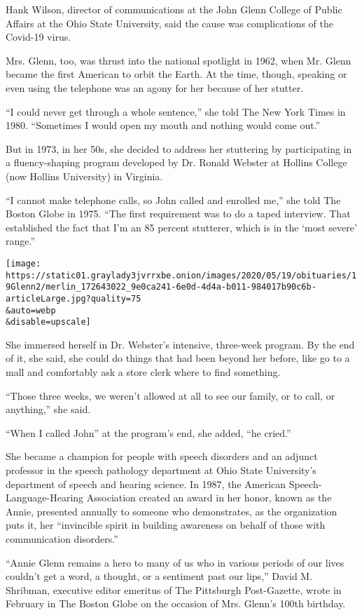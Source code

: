 Hank Wilson, director of communications at the John Glenn College of
Public Affairs at the Ohio State University, said the cause was
complications of the Covid-19 virus.

Mrs. Glenn, too, was thrust into the national spotlight in 1962, when
Mr. Glenn became the first American to orbit the Earth. At the time,
though, speaking or even using the telephone was an agony for her
because of her stutter.

``I could never get through a whole sentence,'' she told The New York
Times in 1980. ``Sometimes I would open my mouth and nothing would come
out.''

But in 1973, in her 50s, she decided to address her stuttering by
participating in a fluency-shaping program developed by Dr. Ronald
Webster at Hollins College (now Hollins University) in Virginia.

``I cannot make telephone calls, so John called and enrolled me,'' she
told The Boston Globe in 1975. ``The first requirement was to do a taped
interview. That established the fact that I'm an 85 percent stutterer,
which is in the `most severe' range.''

\texttt{[image: https://static01.graylady3jvrrxbe.onion/images/2020/05/19/obituaries/19Glenn2/merlin\_172643022\_9e0ca241-6e0d-4d4a-b011-984017b90c6b-articleLarge.jpg?quality=75\\\&auto=webp\\\&disable=upscale]}

She immersed herself in Dr. Webster's intensive, three-week program. By
the end of it, she said, she could do things that had been beyond her
before, like go to a mall and comfortably ask a store clerk where to
find something.

``Those three weeks, we weren't allowed at all to see our family, or to
call, or anything,'' she said.

``When I called John'' at the program's end, she added, ``he cried.''

She became a champion for people with speech disorders and an adjunct
professor in the speech pathology department at Ohio State University's
department of speech and hearing science. In 1987, the American
Speech-Language-Hearing Association created an award in her honor, known
as the Annie, presented annually to someone who demonstrates, as the
organization puts it, her ``invincible spirit in building awareness on
behalf of those with communication disorders.''

``Annie Glenn remains a hero to many of us who in various periods of our
lives couldn't get a word, a thought, or a sentiment past our lips,''
David M. Shribman, executive editor emeritus of The Pittsburgh
Post-Gazette, wrote in February in The Boston Globe on the occasion of
Mrs. Glenn's 100th birthday.

